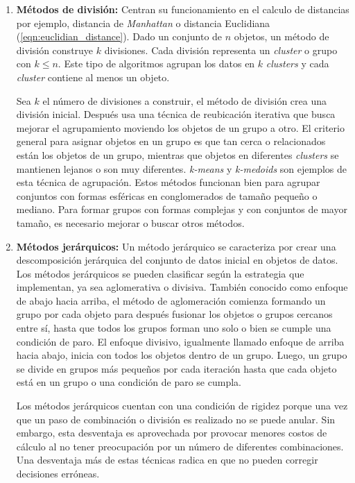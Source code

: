 \begin{enumerate}
    \item \textbf{Métodos de división:} Centran su funcionamiento en el calculo de distancias por ejemplo, distancia de \textit{Manhattan} o distancia Euclidiana (\ref{eqn:euclidian_distance}). Dado un conjunto de $n$ objetos, un método de división construye $k$ divisiones. Cada división representa un \textit{cluster} o grupo con $k \leq n$. Este tipo de algoritmos agrupan los datos en $k$ \textit{clusters} y cada \textit{cluster} contiene al menos un objeto.
    
    Sea $k$ el número de divisiones a construir, el método de división crea una división inicial. Después usa una técnica de reubicación iterativa que busca mejorar el agrupamiento moviendo los objetos de un grupo a otro. El criterio general para asignar objetos en un grupo es que tan cerca o relacionados están los objetos de un grupo, mientras que objetos en diferentes \textit{clusters} se mantienen lejanos o son muy diferentes. \textit{k-means} y \textit{k-medoids} son ejemplos de esta técnica de agrupación. Estos métodos funcionan bien para agrupar conjuntos con formas esféricas en conglomerados de tamaño pequeño o mediano. Para formar grupos con formas complejas y con conjuntos de mayor tamaño, es necesario mejorar o buscar otros métodos.
    
    \item \textbf{ Métodos jerárquicos:} Un método jerárquico se caracteriza por crear una descomposición jerárquica del conjunto de datos inicial en objetos de datos. Los métodos jerárquicos se pueden clasificar según la estrategia que implementan, ya sea aglomerativa o divisiva. También conocido como enfoque de abajo hacia arriba, el método de aglomeración comienza formando un grupo por cada objeto para después fusionar los objetos o grupos cercanos entre sí, hasta que todos los grupos forman uno solo o bien se cumple una condición de paro. El enfoque divisivo, igualmente llamado enfoque de arriba hacia abajo, inicia con todos los objetos dentro de un grupo. Luego, un grupo se divide en grupos más pequeños por cada iteración hasta que cada objeto está en un grupo o una condición de paro se cumpla.
    
    Los métodos jerárquicos cuentan con una condición de rigidez porque una vez que un paso de combinación o división es realizado no se puede anular. Sin embargo, esta desventaja es aprovechada por provocar menores costos de cálculo al no tener preocupación por un número de diferentes combinaciones. Una desventaja más de estas técnicas radica en que no pueden corregir decisiones erróneas.
    

\end{enumerate}

